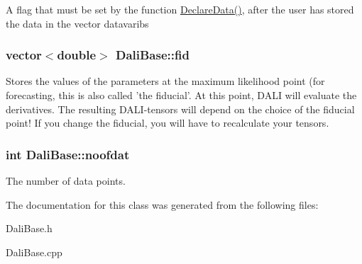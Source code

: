 A flag that must be set by the function \hyperlink{classDaliBase_ac0acf75f804718d75ba8ec375c342fad}{Declare\-Data()}, after the user has stored the data in the vector datavaribs \hypertarget{classDaliBase_ab132077315b2aadc9368a29baec1c8f0}{
\subsubsection[{fid}]{\setlength{\rightskip}{0pt plus 5cm}vector$<$double$>$ Dali\-Base\-::fid}}\label{classDaliBase_ab132077315b2aadc9368a29baec1c8f0}
Stores the values of the parameters at the maximum likelihood point (for forecasting, this is also called 'the fiducial'. At this point, D\-A\-L\-I will evaluate the derivatives. The resulting D\-A\-L\-I-\/tensors will depend on the choice of the fiducial point! If you change the fiducial, you will have to recalculate your tensors. \hypertarget{classDaliBase_abbecb7f25a3040e674377cd9915f1183}{
\subsubsection[{noofdat}]{\setlength{\rightskip}{0pt plus 5cm}int Dali\-Base\-::noofdat}}\label{classDaliBase_abbecb7f25a3040e674377cd9915f1183}
The number of data points. 

The documentation for this class was generated from the following files\-:\begin{DoxyCompactItemize}
\item 
Dali\-Base.\-h\item 
Dali\-Base.\-cpp\end{DoxyCompactItemize}
